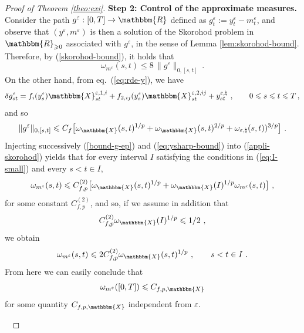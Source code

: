 \documentclass[11pt,reqno,oneside]{amsart}
\numberwithin{equation}{section}
\newcommand{\tmtextbf}[1]{{\bfseries{#1}}}
\newcommand{\ep}{\varepsilon}
\begin{document}
\begin{proof}[Proof of Theorem \ref{theo:exi}]
  {\noindent}\tmtextbf{Step 2: Control of the approximate measures.} 
	Consider the path $g^\ep:[0,T]\to \mathbbm{R}$ defined as $g^\ep_t:=y^\ep_t-m^\ep_t$, and observe that $(y^\ep,m^\ep)$ is then a solution of the Skorohod problem in $\mathbbm{R}_{\geqslant 0}$ associated with $g^\ep$, in the sense of Lemma \ref{lem:skorohod-bound}. Therefore, by (\ref{skorohod-bound}), it holds that
\begin{equation}\label{appli-skorohod}
\omega_{m^\ep}(s,t)\leqslant 8 \, \| g^\ep \|_{0,[s,t]} \ .
\end{equation}
On the other hand, from eq.~(\ref{eq:rde-y}), we have
$$\delta g^\ep_{st}=f_i (y^{\varepsilon}_s)
     \mathbbm{X}^{\varepsilon, 1,i}_{s t} + f_{2,ij} (y^{\varepsilon}_s)
     \mathbbm{X}^{\varepsilon, 2,ij}_{s t} + y^{\varepsilon, \natural}_{s t} \ ,
     \qquad 0 \leqslant s \leqslant t \leqslant T \, ,$$
		and so
\begin{equation}\label{bound-g-ep}
\| g^\ep \|_{0,[s,t]} \leqslant C_f \big[\omega_{\mathbbm{X}} (s,
     t)^{1 / p} + \omega_{\mathbbm{X}} (s, t)^{2 / p} + \omega_{\ep,\natural} (s,
     t))^{3 / p} \big] \ .
		\end{equation}
		Injecting successively (\ref{bound-g-ep}) and (\ref{eq:ysharp-bound}) into (\ref{appli-skorohod}) yields that for every interval $I$ satisfying the conditions in (\ref{eq:I-small}) and every $s<t\in I$,
		$$\omega_{m^\ep}(s,t)\leqslant C^{(2)}_{f,p} \big[ \omega_{\mathbbm{X}}(s,t)^{1/p}+\omega_{\mathbbm{X}}(I)^{1/p} \omega_{m^\ep}(s,t) \big] \ ,$$
		for some constant $C^{(2)}_{f,p}$, and so, if we assume in addition that
\begin{equation}\label{cond-i-two}
C^{(2)}_{f,p}\omega_{\mathbbm{X}}(I)^{1/p} \leqslant 1/2 \ ,
\end{equation}
		we obtain 
\begin{equation}\label{bou-m-ep-loc}
\omega_{m^\ep}(s,t)\leqslant 2C^{(2)}_{f,p} \omega_{\mathbbm{X}}(s,t)^{1/p} \ , \qquad s<t\in I \ .
\end{equation}
From here we can easily conclude that
\begin{equation}\label{eq:measure-bounds}
\omega_{m^\ep}([0,T])\leqslant C_{f,p,\mathbbm{X}} 
\end{equation}
for some quantity $C_{f,p,\mathbbm{X}}$ independent from $\ep$.
	
	
	\
	

\end{proof}
\end{document}

